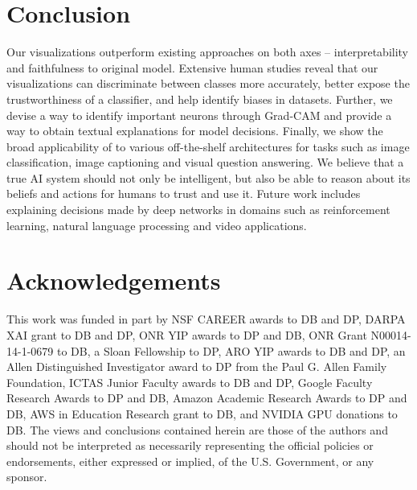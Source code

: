 \vspace{-10pt}
\section{Conclusion}
Our visualizations outperform existing approaches on both axes -- interpretability
and faithfulness to original model. Extensive human studies reveal that our
visualizations can discriminate between classes more accurately, better expose
the trustworthiness of a classifier, and help identify biases in datasets.
Further, we devise a way to identify important neurons through Grad-CAM and provide a way to obtain textual explanations for model decisions.
Finally, we show the broad applicability of \gcam{} to various off-the-shelf
architectures for tasks such as image classification, image captioning and
visual question answering. 
We believe that a true AI system should not only be intelligent, but also be able
to reason about its beliefs and actions for humans to trust and use it.
Future work includes explaining decisions made by deep networks in domains such
as reinforcement learning, natural language processing and video applications.



\vspace{-10pt}
\section{Acknowledgements}

This work was funded in part by NSF CAREER awards to
DB and DP, DARPA XAI grant to DB and DP, ONR YIP awards to DP and DB, ONR Grant
N00014-14-1-0679 to DB, a Sloan Fellowship to DP, ARO
YIP awards to DB and DP, an Allen Distinguished Investigator
award to DP from the Paul G. Allen Family Foundation,
ICTAS Junior Faculty awards to DB and DP, Google
Faculty Research Awards to DP and DB, Amazon Academic
Research Awards to DP and DB, AWS in Education
Research grant to DB, and NVIDIA GPU donations to DB. The
views and conclusions contained herein are those of the authors
and should not be interpreted as necessarily representing
the official policies or endorsements, either expressed or
implied, of the U.S. Government, or any sponsor.

